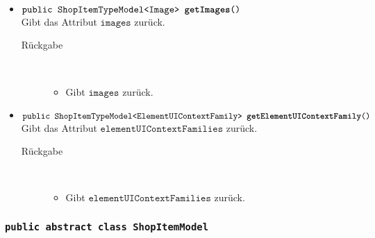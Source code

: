 \begin{description}
\begin{itemize}
		\item $\texttt{public ShopItemTypeModel<Image> \textbf{getImages}()}$ \\ Gibt das Attribut $\texttt{images}$ zurück.
		\begin{description}
			\item[Rückgabe] \hfill \\
			\vspace{-.8cm}
			\begin{itemize}
				\item Gibt $\texttt{images}$ zurück.
			\end{itemize}
			\end{description}
			
		\item $\texttt{public ShopItemTypeModel<ElementUIContextFamily> \textbf{getElementUIContextFamily}()}$ \\ Gibt das Attribut $\texttt{elementUIContextFamilies}$ zurück.
		\begin{description}
			\item[Rückgabe] \hfill \\
			\vspace{-.8cm}
			\begin{itemize}
				\item Gibt $\texttt{elementUIContextFamilies}$ zurück.
			\end{itemize}
			\end{description}

		\end{itemize}
	\end{description}











\subsubsection{\normalfont \texttt{public abstract class \textbf{ShopItemModel}}}

